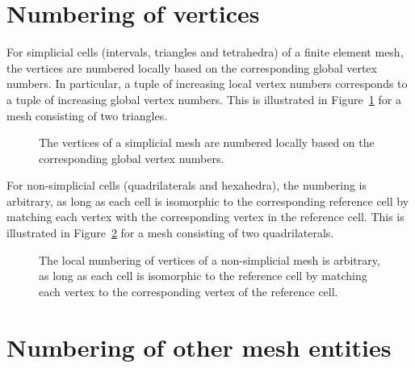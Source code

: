 \section{Numbering of vertices}

For simplicial cells (intervals, triangles and tetrahedra) of a finite
element mesh, the vertices are numbered locally based on the
corresponding global vertex numbers. In particular, a tuple of
increasing local vertex numbers corresponds to a tuple of increasing
global vertex numbers.  This is illustrated in
Figure~\ref{fig:numbering_example_triangles} for a mesh consisting of
two triangles.
 
\begin{figure}[htbp]
  \begin{center}
    \caption{The vertices of a simplicial mesh are numbered locally
      based on the corresponding global vertex numbers.}
    \label{fig:numbering_example_triangles}
  \end{center}
\end{figure}

For non-simplicial cells (quadrilaterals and hexahedra), the numbering
is arbitrary, as long as each cell is isomorphic to the corresponding
reference cell by matching each vertex with the corresponding vertex
in the reference cell. This is illustrated in
Figure~\ref{fig:numbering_example_quadrilaterals} for a mesh
consisting of two quadrilaterals.

\begin{figure}[htbp]
  \begin{center}
    \caption{The local numbering of vertices of a non-simplicial mesh
      is arbitrary, as long as each cell is isomorphic to the
      reference cell by matching each vertex to the corresponding
      vertex of the reference cell.}
    \label{fig:numbering_example_quadrilaterals}
  \end{center}
\end{figure}

\section{Numbering of other mesh entities}

